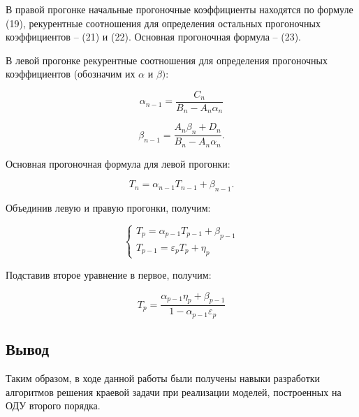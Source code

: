 \documentclass[a4paper,14pt]{article}
\begin{document}
В правой прогонке начальные прогоночные коэффициенты находятся
по формуле (19), рекурентные соотношения для определения остальных прогоночных
коэффициентов -- (21) и (22). Основная прогоночная формула -- (23).

В левой прогонке рекурентные соотношения для определения прогоночных коэффициентов (обозначим их $\alpha$ и $\beta)$:

\begin{equation}
	\alpha_{n-1} = \frac{C_n}{B_n - A_n \alpha_n}
\end{equation}

\begin{equation}
	\beta_{n-1} = \frac{A_n\beta_n + D_n}{B_n - A_n \alpha_n}.
\end{equation}

Основная прогоночная формула для левой прогонки:

\begin{equation}
	T_n = \alpha_{n-1} T_{n-1} + \beta_{n-1}.
\end{equation}

Объединив левую и правую прогонки, получим:

\begin{equation}
	\begin{cases}
		T_p = \alpha_{p-1} T_{p-1} + \beta_{p-1} \\
		T_{p-1} = \varepsilon_p T_p + \eta_{p}
	\end{cases}
\end{equation}

Подставив второе уравнение в первое, получим:

\begin{equation}
	T_p = \frac{\alpha_{p-1} \eta_p + \beta_{p-1}}{1 - \alpha_{p-1} \varepsilon_p}
\end{equation}

\subsection*{Вывод}

Таким образом, в ходе данной работы были получены навыки разработки 
алгоритмов решения краевой задачи при реализации моделей, 
построенных на  ОДУ второго порядка.
\end{document}

